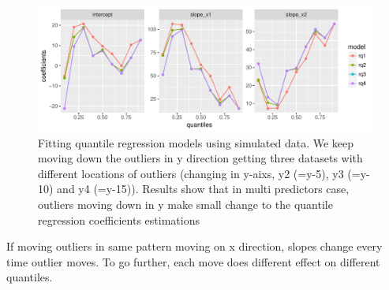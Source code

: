 \documentclass[11pt,a4paper,]{article}
\theoremstyle{definition}
\theoremstyle{definition}
\theoremstyle{remark}
\begin{document}
\begin{figure}

{\centering \includegraphics{Diagnosing_outliers_and_visualization_of_quantile_regression_models_files/figure-latex/move-y-multi1-1} 

}

\caption{Fitting quantile regression models using simulated data. We keep moving down the outliers in y direction getting three datasets with different locations of outliers (changing in y-aixs, y2 (=y-5), y3 (=y-10) and y4 (=y-15)). Results show that in multi predictors case, outliers moving down in y make small change to the quantile regression coefficients estimations}\label{fig:move-y-multi1}
\end{figure}

If moving outliers in same pattern moving on x direction, slopes change
every time outlier moves. To go further, each move does different effect
on different quantiles.
\end{document}

